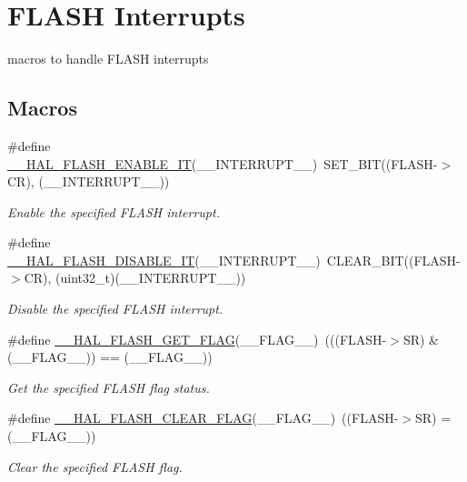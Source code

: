 \hypertarget{group___f_l_a_s_h___interrupt}{}\section{F\+L\+A\+SH Interrupts}
\label{group___f_l_a_s_h___interrupt}


macros to handle F\+L\+A\+SH interrupts  


\subsection*{Macros}
\begin{DoxyCompactItemize}
\item 
\#define \hyperlink{group___f_l_a_s_h___interrupt_ga13fa137a911f02a2f94fb9fb0762a340}{\+\_\+\+\_\+\+H\+A\+L\+\_\+\+F\+L\+A\+S\+H\+\_\+\+E\+N\+A\+B\+L\+E\+\_\+\+IT}(\+\_\+\+\_\+\+I\+N\+T\+E\+R\+R\+U\+P\+T\+\_\+\+\_\+)~S\+E\+T\+\_\+\+B\+IT((F\+L\+A\+SH-\/$>$CR), (\+\_\+\+\_\+\+I\+N\+T\+E\+R\+R\+U\+P\+T\+\_\+\+\_\+))
\begin{DoxyCompactList}\small\item\em Enable the specified F\+L\+A\+SH interrupt. \end{DoxyCompactList}\item 
\#define \hyperlink{group___f_l_a_s_h___interrupt_ga1f40f507b5d4b3a4da68e4244a1097ee}{\+\_\+\+\_\+\+H\+A\+L\+\_\+\+F\+L\+A\+S\+H\+\_\+\+D\+I\+S\+A\+B\+L\+E\+\_\+\+IT}(\+\_\+\+\_\+\+I\+N\+T\+E\+R\+R\+U\+P\+T\+\_\+\+\_\+)~C\+L\+E\+A\+R\+\_\+\+B\+IT((F\+L\+A\+SH-\/$>$CR), (uint32\+\_\+t)(\+\_\+\+\_\+\+I\+N\+T\+E\+R\+R\+U\+P\+T\+\_\+\+\_\+))
\begin{DoxyCompactList}\small\item\em Disable the specified F\+L\+A\+SH interrupt. \end{DoxyCompactList}\item 
\#define \hyperlink{group___f_l_a_s_h___interrupt_ga0d3dd161fecc0e47c9e109c7c28672c1}{\+\_\+\+\_\+\+H\+A\+L\+\_\+\+F\+L\+A\+S\+H\+\_\+\+G\+E\+T\+\_\+\+F\+L\+AG}(\+\_\+\+\_\+\+F\+L\+A\+G\+\_\+\+\_\+)~(((F\+L\+A\+SH-\/$>$SR) \& (\+\_\+\+\_\+\+F\+L\+A\+G\+\_\+\+\_\+)) == (\+\_\+\+\_\+\+F\+L\+A\+G\+\_\+\+\_\+))
\begin{DoxyCompactList}\small\item\em Get the specified F\+L\+A\+SH flag status. \end{DoxyCompactList}\item 
\#define \hyperlink{group___f_l_a_s_h___interrupt_ga68e49c4675761e2ec35153e747de7622}{\+\_\+\+\_\+\+H\+A\+L\+\_\+\+F\+L\+A\+S\+H\+\_\+\+C\+L\+E\+A\+R\+\_\+\+F\+L\+AG}(\+\_\+\+\_\+\+F\+L\+A\+G\+\_\+\+\_\+)~((F\+L\+A\+SH-\/$>$SR) = (\+\_\+\+\_\+\+F\+L\+A\+G\+\_\+\+\_\+))
\begin{DoxyCompactList}\small\item\em Clear the specified F\+L\+A\+SH flag. \end{DoxyCompactList}\end{DoxyCompactItemize}


